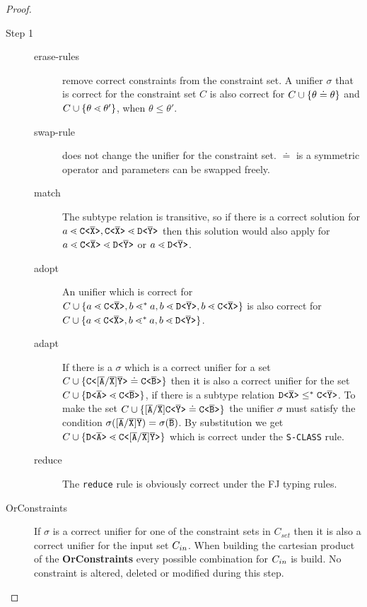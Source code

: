 \begin{proof}
\begin{description}
\item[Step 1]
\begin{description}
\item[erase-rules] remove correct constraints from the constraint set.
A unifier $\sigma$ that is correct for the constraint set $C$
is also correct for $C \cup \{ \theta \doteq \theta \}$
and $C \cup \{ \theta \lessdot \theta' \}$, when $\theta \leq \theta'$.
\item[swap-rule] does not change the unifier for the constraint set.
$\doteq$ is a symmetric operator and parameters can be swapped freely.
\item[match] The subtype relation is transitive, so if there is a correct solution for
$a \lessdot \mathtt{C \texttt{<} \overline{\tt X} \texttt{>} }, \mathtt{C \texttt{<} \overline{\tt X} \texttt{>} } \lessdot \mathtt{D \texttt{<} \overline{\tt Y} \texttt{>} }$
then this solution would also apply for $a \lessdot \mathtt{C \texttt{<} \overline{\tt X} \texttt{>} } \lessdot \mathtt{D \texttt{<} \overline{\tt Y} \texttt{>} }$
or $a \lessdot \mathtt{D \texttt{<} \overline{\tt Y} \texttt{>} }$.
\item[adopt] An unifier which is correct for $C \cup \{ a \lessdot \mathtt{C \texttt{<} \overline{\tt X} \texttt{>} }, b \lessdot^* a, b \lessdot \mathtt{D \texttt{<} \overline{\tt Y} \texttt{>} }, b \lessdot \mathtt{C \texttt{<} \overline{\tt X} \texttt{>} } \}$
is also correct for $C \cup \{ a \lessdot \mathtt{C \texttt{<} \overline{\tt X} \texttt{>} }, b \lessdot^* a, b \lessdot \mathtt{D \texttt{<} \overline{\tt Y} \texttt{>} } \}$.
\item[adapt] If there is a $\sigma$ which is a correct unifier for a set
$C \cup \{  \mathtt{C \texttt{<} [\overline{\tt A}/\overline{\tt X}]\overline{\tt Y} \texttt{>} } \doteq \mathtt{C \texttt{<} \overline{\tt B} \texttt{>} } \}$ then it is also
a correct unifier for the set $C \cup \{  \mathtt{D \texttt{<} \overline{\tt A} \texttt{>} } \lessdot \mathtt{C \texttt{<} \overline{\tt B} \texttt{>} } \}$,
if there is a subtype relation $\mathtt{D \texttt{<} \overline{\tt X} \texttt{>} } \leq^* \mathtt{C \texttt{<} \overline{\tt Y} \texttt{>} }$.
To make the set $C \cup \{  [\overline{\tt A}/\overline{\tt X}]\mathtt{C \texttt{<} \overline{\tt Y} \texttt{>} } \doteq \mathtt{C \texttt{<} \overline{\tt B} \texttt{>} } \}$ the unifier 
$\sigma$ must satisfy the condition $\sigma([\overline{\tt A}/\overline{\tt X}]\overline{\tt Y}) = \sigma(\overline{\tt B})$.
By substitution we get $C \cup \{  \mathtt{D \texttt{<} \overline{\tt A} \texttt{>} } \lessdot \mathtt{C \texttt{<} [\overline{\tt A}/\overline{\tt X}]\overline{\tt Y} \texttt{>} } \}$
which is correct under the \texttt{S-CLASS} rule.
\item[reduce] The \texttt{reduce} rule is obviously correct under the FJ typing rules.
\end{description}

\item[OrConstraints]
If $\sigma$ is a correct unifier for one of the constraint sets in $C_{set}$
then it is also a correct unifier for the input set $C_{in}$.
When building the cartesian product of the \textbf{OrConstraints} every possible
combination for $C_{in}$ is build.
No constraint is altered, deleted or modified during this step.
\end{description}
\end{proof}

